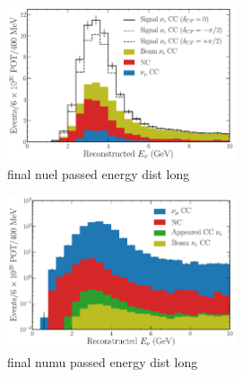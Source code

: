 \begin{figure} %
    \includegraphics[width=0.6\textwidth]{diagrams/6-cvn/chipsnet/final_nuel_passed_energy_dist.pdf}
    \caption[final nuel passed energy dist short]
    {final nuel passed energy dist long}
    \label{fig:final_nuel_passed_energy_dist}
\end{figure}

\begin{figure} %
    \includegraphics[width=0.6\textwidth]{diagrams/6-cvn/chipsnet/final_numu_passed_energy_dist.pdf}
    \caption[final numu passed energy dist short]
    {final numu passed energy dist long}
    \label{fig:final_numu_passed_energy_dist}
\end{figure}

